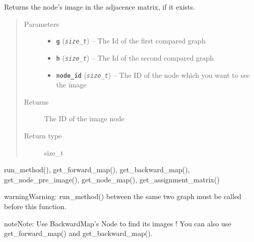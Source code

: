 \documentclass[letterpaper,10pt,english]{sphinxmanual}
\begin{document}
\begin{fulllineitems}
\label{doc:gedlibpy.get_node_image}
Returns the node's image in the adjacence matrix, if it exists.
\begin{quote}\begin{description}
\item[{Parameters}] \leavevmode\begin{itemize}
\item {} 
\textbf{\texttt{g}} (\emph{\texttt{size\_t}}) -- The Id of the first compared graph

\item {} 
\textbf{\texttt{h}} (\emph{\texttt{size\_t}}) -- The Id of the second compared graph

\item {} 
\textbf{\texttt{node\_id}} (\emph{\texttt{size\_t}}) -- The ID of the node which you want to see the image

\end{itemize}

\item[{Returns}] \leavevmode
The ID of the image node

\item[{Return type}] \leavevmode
size\_t

\end{description}\end{quote}




run\_method(), get\_forward\_map(), get\_backward\_map(), get\_node\_pre\_image(), get\_node\_map(), get\_assignment\_matrix()



\begin{notice}{warning}{Warning:}
run\_method() between the same two graph must be called before this function.
\end{notice}

\begin{notice}{note}{Note:}
Use BackwardMap's Node to find its images ! You can also use get\_forward\_map() and get\_backward\_map().
\end{notice}

\end{fulllineitems}

\end{document}
